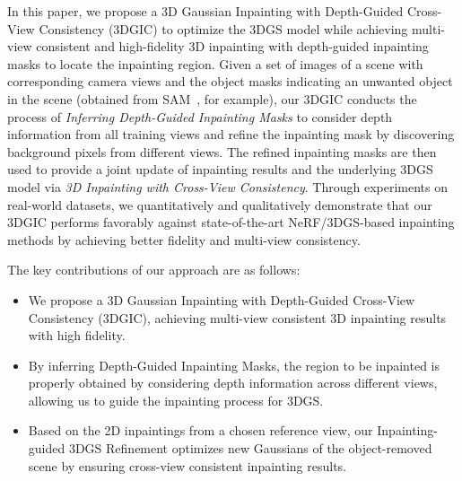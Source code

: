 In this paper, we propose a 3D Gaussian Inpainting with Depth-Guided Cross-View Consistency (3DGIC) to optimize the 3DGS model while achieving multi-view consistent and high-fidelity 3D inpainting with depth-guided inpainting masks to locate the inpainting region. Given a set of images of a scene with corresponding camera views and the object masks indicating an unwanted object in the scene (obtained from SAM~\cite{kirillov2023sam}, for example), our 3DGIC conducts the process of \textit{Inferring Depth-Guided Inpainting Masks} to consider depth information from all training views and refine the inpainting mask by discovering background pixels from different views. The refined inpainting masks are then used to provide a joint update of inpainting results and the underlying 3DGS model via \textit{3D Inpainting with Cross-View Consistency}. 
Through experiments on real-world datasets, we quantitatively and qualitatively demonstrate that our 3DGIC performs favorably against state-of-the-art NeRF/3DGS-based inpainting methods by achieving better fidelity and multi-view consistency.


The key contributions of our approach are as follows:
\begin{itemize}
\item We propose a 3D Gaussian Inpainting with Depth-Guided Cross-View Consistency (3DGIC), achieving multi-view consistent 3D inpainting results with high fidelity.
\item By inferring Depth-Guided Inpainting Masks, the region to be inpainted is properly obtained by considering depth information across different views, allowing us to guide the inpainting process for 3DGS.
\item Based on the 2D inpaintings from a chosen reference view, our Inpainting-guided 3DGS Refinement optimizes new Gaussians of the object-removed scene by ensuring cross-view consistent inpainting results.
\end{itemize}



